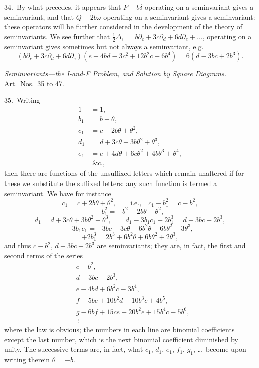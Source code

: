 \documentclass[11pt]{article}
\begin{document}
34.\ By what precedes, it appears that $P - b\delta$ operating on a seminvariant gives a seminvariant, and that $Q - 2b\omega$ operating on a seminvariant gives a seminvariant: these operators will be further considered in the development of the theory of seminvariants. We see further that $\tfrac{1}{2}\Delta$, $= b\partial_c + 3c\partial_d + 6d\partial_e + \ldots$, operating on a seminvariant gives sometimes but not always a seminvariant, e.g.
\[
(b\partial_c + 3c\partial_d + 6d\partial_e)(e - 4bd - 3c^2 + 12b^2c - 6b^4) = 6(d - 3bc + 2b^3).
\]

\begin{center}
\textit{Seminvariants---the I-and-F Problem, and Solution by Square Diagrams.}\\
Art.\ Nos.\ 35 to 47.
\end{center}

35.\ Writing
\begin{align*}
1 &= 1, \\
b_1 &= b + \theta, \\
c_1 &= c + 2b\theta + \theta^2, \\
d_1 &= d + 3c\theta + 3b\theta^2 + \theta^3, \\
e_1 &= e + 4d\theta + 6c\theta^2 + 4b\theta^3 + \theta^4, \\
&\;\&c.,
\end{align*}
then there are functions of the unsuffixed letters which remain unaltered if for these we substitute the suffixed letters: any such function is termed a seminvariant. We have for instance
\[
c_1 = c + 2b\theta + \theta^2,\qquad\text{i.e.,}\quad c_1 - b_1^2 = c - b^2,
\]
\[
-b_1^2 = -b^2 - 2b\theta - \theta^2,
\]
\[
d_1 = d + 3c\theta + 3b\theta^2 + \theta^3,\qquad d_1 - 3b_1 c_1 + 2b_1^3 = d - 3bc + 2b^3,
\]
\[
-3b_1 c_1 = -3bc - 3c\theta - 6b^2\theta - 6b\theta^2 - 3\theta^3,
\]
\[
+ 2b_1^3 = 2b^3 + 6b^2\theta + 6b\theta^2 + 2\theta^3,
\]
and thus $c - b^2$, $d - 3bc + 2b^3$ are seminvariants; they are, in fact, the first and second terms of the series
\begin{align*}
& c - b^2, \\
& d - 3bc + 2b^3, \\
& e - 4bd + 6b^2 c - 3b^4, \\
& f - 5be + 10b^2 d - 10b^3 c + 4b^5, \\
& g - 6bf + 15ce - 20b^2 e + 15b^4 c - 5b^6, \\
& \;\vdots
\end{align*}
where the law is obvious; the numbers in each line are binomial coefficients except the last number, which is the next binomial coefficient diminished by unity. The successive terms are, in fact, what $c_1$, $d_1$, $e_1$, $f_1$, $g_1$, \ldots\ become upon writing therein $\theta = -b$.
\end{document}
